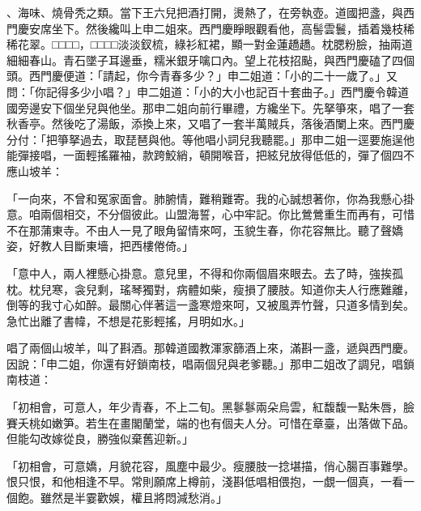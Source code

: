 \begin{showcontents}{}
、海味、燒骨秃之類。當下王六兒把酒打開，燙熱了，在旁執壺。道國把盞，與西門慶安席坐下。然後纔叫上申二姐來。西門慶睜眼觀看他，高髻雲鬟，插着幾枝稀稀花翠。□□□□，□□□□淡淡釵梳，綠衫紅裙，顯一對金蓮趫趫。枕腮粉臉，抽兩道細細春山。青石墜子耳邊垂，糯米銀牙噙口內。望上花枝招颭，與西門慶磕了四個頭。西門慶便道：「請起，你今青春多少？」申二姐道：「小的二十一歲了。」又問：「你記得多少小唱？」申二姐道：「小的大小也記百十套曲子。」西門慶令韓道國旁邊安下個坐兒與他坐。那申二姐向前行畢禮，方纔坐下。先拏箏來，唱了一套秋香亭。然後吃了湯飯，添換上來，又唱了一套半萬賊兵，落後酒闌上來。西門慶分付：「把箏拏過去，取琵琶與他。等他唱小詞兒我聽罷。」那申二姐一逕要施逞他能彈接唱，一面輕搖羅袖，款跨鮫綃，頓開喉音，把絃兒放得低低的，彈了個四不應山坡羊：

「一向來，不曾和冤家面會。肺腑情，難稍難寄。我的心誠想著你，你為我懸心掛意。咱兩個相交，不分個彼此。山盟海誓，心中牢記。你比鶯鶯重生而再有，可惜不在那蒲東寺。不由人一見了眼角留情來呵，玉貌生春，你花容無比。聽了聲嬌姿，好教人目斷東墻，把西樓倦倚。」

「意中人，兩人裡懸心掛意。意兒里，不得和你兩個眉來眼去。去了時，強挨孤枕。枕兒寒，衾兒剩，瑤琴獨對，病體如柴，瘦損了腰肢。知道你夫人行應難離，倒等的我寸心如醉。最關心伴著這一盞寒燈來呵，又被風弄竹聲，只道多情到矣。急忙出離了書幃，不想是花影輕搖，月明如水。」

唱了兩個山坡羊，叫了斟酒。那韓道國教渾家篩酒上來，滿斟一盞，遞與西門慶。因說：「申二姐，你還有好鎖南枝，唱兩個兒與老爹聽。」那申二姐改了調兒，唱鎖南枝道：

「初相會，可意人，年少青春，不上二旬。黑鬖鬖兩朵烏雲，紅馥馥一點朱唇，臉賽夭桃如嫩笋。若生在畫閣蘭堂，端的也有個夫人分。可惜在章臺，出落做下品。但能勾改嫁從良，勝強似棄舊迎新。」

「初相會，可意嬌，月貌花容，風塵中最少。瘦腰肢一捻堪描，俏心腸百事難學。恨只恨，和他相逢不早。常則願席上樽前，淺斟低唱相偎抱，一覷一個真，一看一個飽。雖然是半霎歡娛，權且將悶減愁消。」


\end{showcontents}
